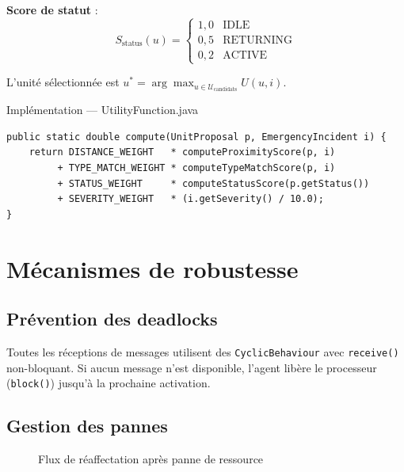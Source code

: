 \documentclass[12pt, a4paper]{report}
\begin{document}
\textbf{Score de statut} :
\[
  S_{\text{status}}(u) =
  \begin{cases}
    1{,}0 & \text{IDLE} \\
    0{,}5 & \text{RETURNING} \\
    0{,}2 & \text{ACTIVE}
  \end{cases}
\]

L'unité sélectionnée est $u^* = \arg\max_{u \in \mathcal{U}_{\text{candidats}}} U(u,i)$.

\begin{codebox}{Implémentation — UtilityFunction.java}
\begin{lstlisting}
public static double compute(UnitProposal p, EmergencyIncident i) {
    return DISTANCE_WEIGHT   * computeProximityScore(p, i)
         + TYPE_MATCH_WEIGHT * computeTypeMatchScore(p, i)
         + STATUS_WEIGHT     * computeStatusScore(p.getStatus())
         + SEVERITY_WEIGHT   * (i.getSeverity() / 10.0);
}
\end{lstlisting}
\end{codebox}

\section{Mécanismes de robustesse}

\subsection{Prévention des deadlocks}

Toutes les réceptions de messages utilisent des \texttt{CyclicBehaviour} avec
\texttt{receive()} non-bloquant. Si aucun message n'est disponible, l'agent libère
le processeur (\texttt{block()}) jusqu'à la prochaine activation.

\subsection{Gestion des pannes}

\begin{figure}[H]
\centering
{}
\caption{Flux de réaffectation après panne de ressource}
\label{fig:abort}
\end{figure}
\end{document}
